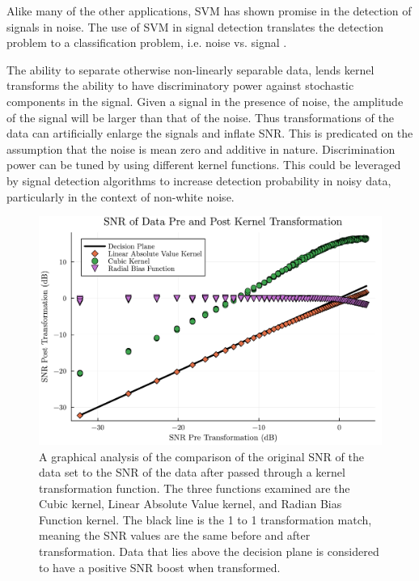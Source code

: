         Alike many of the other applications, SVM has shown promise in the detection of signals in noise. The use of SVM in signal detection translates the detection problem to a classification problem, i.e. noise vs. signal \cite{tan_detection_2019}. 

        The ability to separate otherwise non-linearly separable data, lends kernel transforms the ability to have discriminatory power against stochastic components in the signal. Given a signal in the presence of noise, the amplitude of the signal will be larger than that of the noise. Thus transformations of the data can artificially enlarge the signals and inflate SNR. This is predicated on the assumption that the noise is mean zero and additive in nature. Discrimination power can be tuned by using different kernel functions. This could be leveraged by signal detection algorithms to increase detection probability in noisy data, particularly in the context of non-white noise. 

        \begin{figure}[t]
            \centering
            \includegraphics[scale = 0.6]{images/Background/SNRs.pdf}
            \caption{A graphical analysis of the comparison of the original SNR of the data set to the SNR of the data after passed through a kernel transformation function. The three functions examined are the Cubic kernel, Linear Absolute Value kernel, and Radian Bias Function kernel. The black line is the 1 to 1 transformation match, meaning the SNR values are the same before and after transformation. Data that lies above the decision plane is considered to have a positive SNR boost when transformed.}
            \label{fig:SNR_inflation}
        \end{figure}

